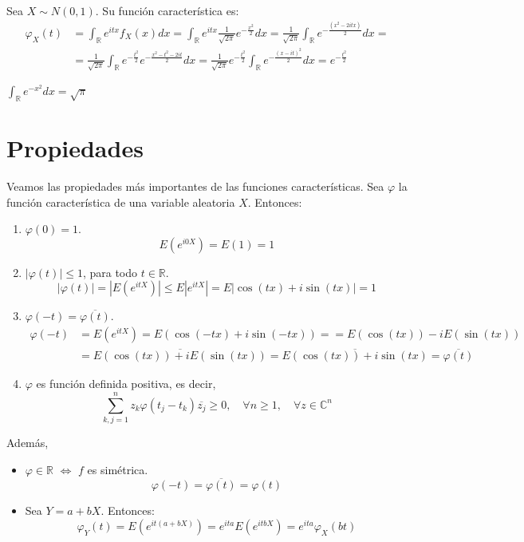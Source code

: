 \begin{example}
    Sea $X \sim N(0, 1)$.
    Su función característica es:
    \begin{align*}
        \varphi_X(t) & = \int_\mathbb{R} e^{itx}f_X(x)dx = \int_\mathbb{R} e^{itx} \frac{1}{\sqrt{2\pi}}e^{-\frac{x^2}{2}}dx = \frac{1}{\sqrt{2\pi}} \int_\mathbb{R} e^{-\frac{(x^2-2itx)}{2}}dx =                     \\
                     & = \frac{1}{\sqrt{2\pi}} \int_\mathbb{R} e^{-\frac{t^2}{2}}e^{-\frac{x^2-t^2-2it}{2}}dx = \frac{1}{\sqrt{2\pi}}e^{-\frac{t^2}{2}} \int_\mathbb{R} e^{-\frac{(x-it)^2}{2}}dx = e^{-\frac{t^2}{2}}
    \end{align*}

    \begin{note}
        $\int_\mathbb{R} e^{-x^2}dx = \sqrt{\pi}$
    \end{note}
\end{example}

\section{Propiedades}
Veamos las propiedades más importantes de las funciones características.
Sea $\varphi$ la función característica de una variable aleatoria $X$.
Entonces:
\begin{enumerate}
    \item $\varphi(0) = 1$.
          $$E(e^{i0X}) = E(1) = 1$$
    \item $|\varphi(t)| \leq 1$, para todo $t \in \mathbb{R}$.
          $$|\varphi(t)| = |E(e^{itX})| \leq E|e^{itX}| = E|\cos(tx) + i\sin(tx)| = 1$$
    \item $\varphi(-t) = \overline{\varphi(t)}$.
          \begin{align*}
              \varphi(-t) & = E(e^{itX}) = E(\cos(-tx) + i\sin(-tx)) = = E(\cos(tx)) - iE(\sin(tx))                              \\
                          & = \overline{E(\cos(tx)) + iE(\sin(tx))} = \overline{E(\cos(tx)) + i\sin(tx)} = \overline{\varphi(t)}
          \end{align*}
    \item $\varphi$ es función definida positiva, es decir,
          $$\sum_{k,j=1}^n z_k\varphi(t_j-t_k)\overline{z_j} \geq 0, \quad \forall n \geq 1, \quad \forall z \in \mathbb{C}^n$$
\end{enumerate}

Además,
\begin{itemize}
    \item $\varphi \in \mathbb{R}$ $\Leftrightarrow$ $f$ es simétrica.
          $$\varphi(-t) = \overline{\varphi(t)} = \varphi(t)$$
    \item Sea $Y = a + bX$. Entonces:
          $$\varphi_Y(t) = E(e^{it(a+bX)}) = e^{ita} E(e^{itbX}) = e^{ita} \varphi_X(bt)$$
\end{itemize}


